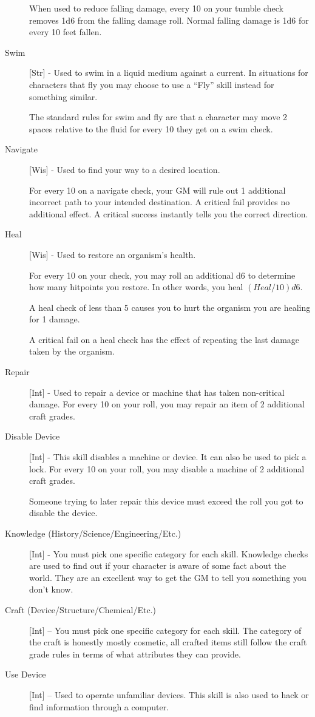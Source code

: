 \begin{description}
When used to reduce falling damage, every 10 on your tumble check removes 1d6 from the falling damage roll. Normal falling damage is 1d6 for every 10 feet fallen.

\item[Swim] [Str] - Used to swim in a liquid medium against a current. In situations for characters that fly you may choose to use a ``Fly'' skill instead for something similar. 

The standard rules for swim and fly are that a character may move 2 spaces relative to the fluid for every 10 they get on a swim check.

\item[Navigate] [Wis] - Used to find your way to a desired location.

For every 10 on a navigate check, your GM will rule out 1 additional incorrect path to your intended destination. A critical fail provides no additional effect. A critical success instantly tells you the correct direction.

\item[Heal] [Wis] - Used to restore an organism's health.

For every 10 on your check, you may roll an additional d6 to determine how many hitpoints you restore. In other words, you heal $(Heal/10)d6$.

A heal check of less than 5 causes you to hurt the organism you are healing for 1 damage.

A critical fail on a heal check has the effect of repeating the last damage taken by the organism.

\item[Repair] [Int] - Used to repair a device or machine that has taken non-critical damage. For every 10 on your roll, you may repair an item of 2 additional craft grades.

\item[Disable Device] [Int] - This skill disables a machine or device. It can also be used to pick a lock. For every 10 on your roll, you may disable a machine of 2 additional craft grades.

Someone trying to later repair this device must exceed the roll you got to disable the device.

\item[Knowledge (History/Science/Engineering/Etc.)] [Int] - You must pick one specific category for each skill. Knowledge checks are used to find out if your character is aware of some fact about the world. They are an excellent way to get the GM to tell you something you don’t know.
\item[Craft (Device/Structure/Chemical/Etc.)] [Int] – You must pick one specific category for each skill. The category of the craft is honestly mostly cosmetic, all crafted items still follow the craft grade rules in terms of what attributes they can provide.
\item[Use Device] [Int] – Used to operate unfamiliar devices. This skill is also used to hack or find information through a computer.
\end{description}


